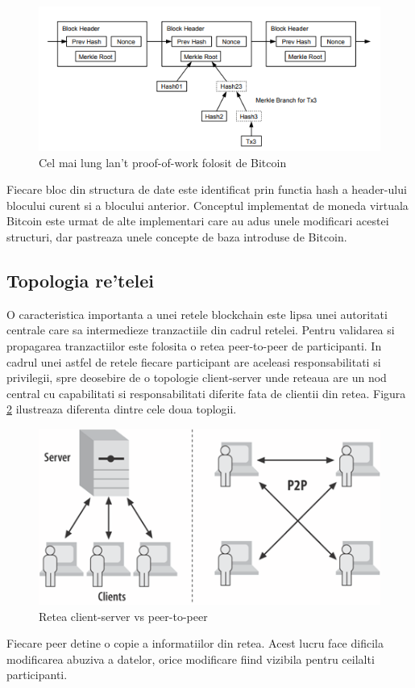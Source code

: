 \documentclass[12pt,a4paper,twoside]{report}
\begin{document}
		\begin{figure}[H]
		\begin{center}
			\includegraphics[scale=2.5]{img/btc.png}
			\caption{Cel mai lung lan't proof-of-work folosit de Bitcoin\cite{bitcoin}}
  			\label{fig:btc}
  		\end{center}
  		\end{figure} 
	
	Fiecare bloc din structura de date este identificat prin functia hash a header-ului blocului curent si a blocului anterior. Conceptul implementat de moneda virtuala Bitcoin este urmat de alte implementari care au adus unele modificari acestei structuri, dar pastreaza unele concepte de baza introduse de Bitcoin. 
	\subsection{Topologia re'telei}
	O caracteristica importanta a unei retele blockchain este lipsa unei autoritati centrale care sa intermedieze tranzactiile din cadrul retelei. Pentru validarea si propagarea tranzactiilor este folosita o retea peer-to-peer de participanti\cite{p2p}. In cadrul unei astfel de retele fiecare participant are aceleasi responsabilitati si privilegii, spre deosebire de o topologie client-server unde reteaua are un nod central cu capabilitati si responsabilitati diferite fata de clientii din retea. Figura \ref{fig:p2p} ilustreaza diferenta dintre cele doua toplogii.
			\begin{figure}[H]
		\begin{center}
			\includegraphics[scale=2]{img/p2p.png}
			\caption{Retea client-server vs peer-to-peer\cite{fabricdoc}}
  			\label{fig:p2p}
  		\end{center}
  		\end{figure}
Fiecare peer detine o copie a informatiilor din retea. Acest lucru face dificila modificarea abuziva a datelor, orice modificare fiind vizibila pentru ceilalti participanti.   
\end{document}
